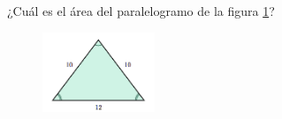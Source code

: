 \question[15] ¿Cuál es el \'area del paralelogramo de la figura \ref{fig:area_isoseles_01}?
\begin{figure}[H]
    \begin{center}
        \includegraphics[width=0.3\textwidth]{../images/area_isoseles_01.png}
    \end{center}
    \caption{}
    \label{fig:area_isoseles_01}
\end{figure}